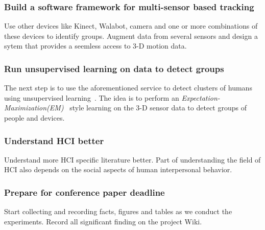 \subsubsection{Build a software framework for multi-sensor based tracking}
Use other devices like Kinect, Walabot, camera and one or more
combinations of these devices to identify groups. Augment data from
several sensors and design a sytem that provides a seemless access to
3-D motion data.

\subsubsection{Run unsupervised learning on data to detect groups}
The next step is to use the aforementioned service to detect clusters
of humans using unsupervised
learning~\cite{James:2014:ISL:2517747}. The idea is to perform an
\emph{Expectation-Maximization(EM)}~\cite{10.2307/2984875} style
learning on the 3-D sensor data to detect groups of people and
devices.

\subsubsection{Understand HCI better}
Understand more HCI specific literature better. Part of understanding
the field of HCI also depends on the social aspects of human
interpersonal behavior.

\subsubsection{Prepare for conference paper deadline}
Start collecting and recording facts, figures and tables as we conduct
the experiments. Record all significant finding on the project Wiki.

